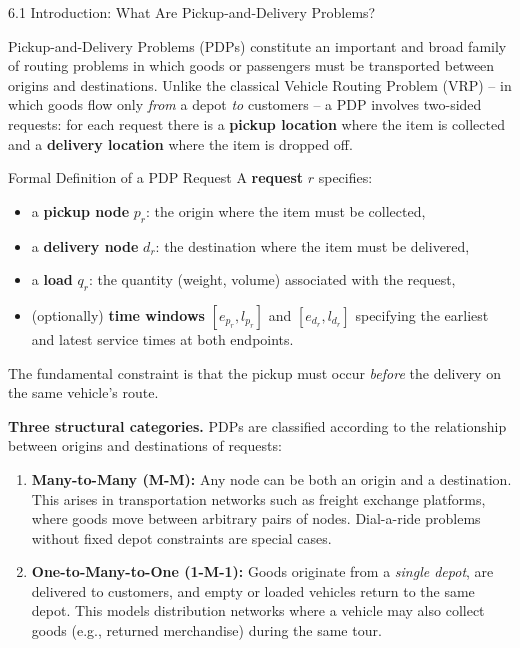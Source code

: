 \documentclass[aspectratio=169,10pt]{beamer}
\begin{document}
\begin{frame}[allowframebreaks]{6.1 Introduction: What Are Pickup-and-Delivery Problems?}

  Pickup-and-Delivery Problems (PDPs) constitute an important and broad family of routing
  problems in which goods or passengers must be transported between origins and destinations.
  Unlike the classical Vehicle Routing Problem (VRP) -- in which goods flow only \emph{from}
  a depot \emph{to} customers -- a PDP involves two-sided requests: for each request there is
  a \textbf{pickup location} where the item is collected and a \textbf{delivery location} where
  the item is dropped off.

  \begin{block}{Formal Definition of a PDP Request}
    A \textbf{request} $r$ specifies:
    \begin{itemize}
      \item a \textbf{pickup node} $p_r$: the origin where the item must be collected,
      \item a \textbf{delivery node} $d_r$: the destination where the item must be delivered,
      \item a \textbf{load} $q_r$: the quantity (weight, volume) associated with the request,
      \item (optionally) \textbf{time windows} $[e_{p_r}, l_{p_r}]$ and $[e_{d_r}, l_{d_r}]$
            specifying the earliest and latest service times at both endpoints.
    \end{itemize}
    The fundamental constraint is that the pickup must occur \emph{before} the delivery on
    the same vehicle's route.
  \end{block}

  \framebreak

  \textbf{Three structural categories.} PDPs are classified according to the relationship
  between origins and destinations of requests:

  \begin{enumerate}
    \item \textbf{Many-to-Many (M-M):} Any node can be both an origin and a destination.
          This arises in transportation networks such as freight exchange platforms, where
          goods move between arbitrary pairs of nodes. Dial-a-ride problems without fixed
          depot constraints are special cases.

    \item \textbf{One-to-Many-to-One (1-M-1):} Goods originate from a \emph{single depot},
          are delivered to customers, and empty or loaded vehicles return to the same depot.
          This models distribution networks where a vehicle may also collect goods (e.g.,
          returned merchandise) during the same tour.


\end{enumerate}
\end{frame}
\end{document}
